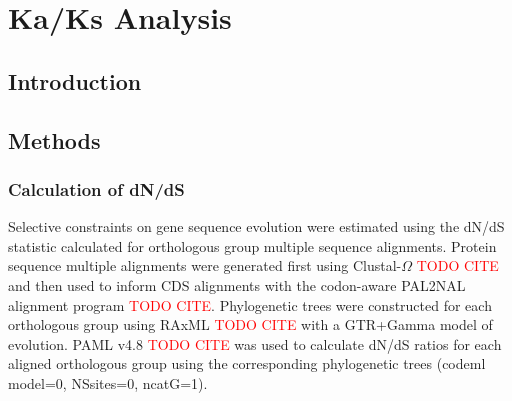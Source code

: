 \section{Ka/Ks Analysis}

\subsection{Introduction}

\subsection{Methods}

\subsubsection{Calculation of dN/dS}

Selective constraints on gene sequence evolution were estimated using the dN/dS statistic calculated for orthologous group multiple sequence alignments. Protein sequence multiple alignments were generated first using Clustal-$\Omega$ \textcolor{red}{TODO CITE} and then used to inform CDS alignments with the codon-aware PAL2NAL alignment program \textcolor{red}{TODO CITE}.
Phylogenetic trees were constructed for each orthologous group using RAxML \textcolor{red}{TODO CITE} with a GTR+Gamma model of evolution. PAML v4.8 \textcolor{red}{TODO CITE} was used to calculate dN/dS ratios for each aligned orthologous group using the corresponding phylogenetic trees (codeml model=0, NSsites=0, ncatG=1). 

